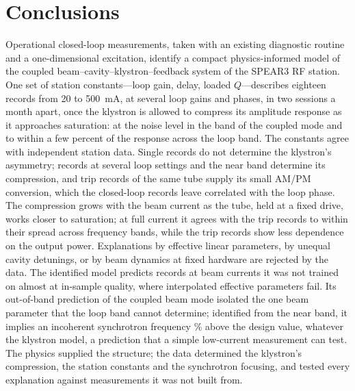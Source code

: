 \section{Conclusions}\label{sec:concl}

Operational closed-loop measurements, taken with an existing diagnostic routine and a one-dimensional excitation, identify a compact physics-informed model of the coupled beam--cavity--klystron--feedback system of the SPEAR3 RF station. One set of station constants---loop gain, delay, loaded $Q$---describes eighteen records from 20 to \SI{500}{mA}, at several loop gains and phases, in two sessions a month apart, once the klystron is allowed to compress its amplitude response as it approaches saturation: at the noise level in the band of the coupled mode and to within a few percent of the response across the loop band. The constants agree with independent station data. Single records do not determine the klystron's asymmetry; records at several loop settings and the near band determine its compression, and trip records of the same tube supply its small AM/PM conversion, which the closed-loop records leave correlated with the loop phase. The compression grows with the beam current as the tube, held at a fixed drive, works closer to saturation; at full current it agrees with the trip records to within their spread across frequency bands, while the trip records show less dependence on the output power. Explanations by effective linear parameters, by unequal cavity detunings, or by beam dynamics at fixed hardware are rejected by the data. The identified model predicts records at beam currents it was not trained on almost at in-sample quality, where interpolated effective parameters fail. Its out-of-band prediction of the coupled beam mode isolated the one beam parameter that the loop band cannot determine; identified from the near band, it implies an incoherent synchrotron frequency \fsRatio\% above the design value, whatever the klystron model, a prediction that a simple low-current measurement can test. The physics supplied the structure; the data determined the klystron's compression, the station constants and the synchrotron focusing, and tested every explanation against measurements it was not built from.
